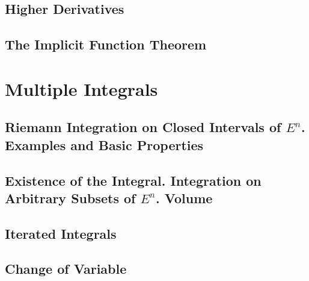 \documentclass{article}
\theoremstyle{definition}
\theoremstyle{theorem}
\begin{document}
		\subsection{Higher Derivatives}
		
		\subsection{The Implicit Function Theorem}
	
	
	\section{Multiple Integrals}
		\subsection{Riemann Integration on Closed Intervals of $E^n$. Examples and Basic Properties}
		
		\subsection{Existence of the Integral. Integration on Arbitrary Subsets of $E^n$. Volume}
		
		\subsection{Iterated Integrals}
		
		\subsection{Change of Variable}

	
\end{document}
